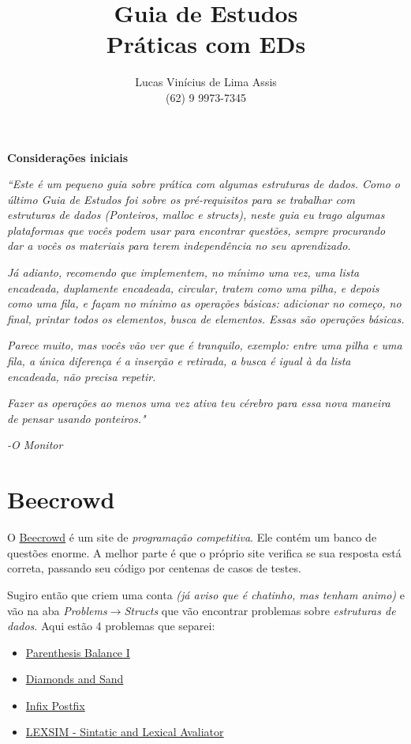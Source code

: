 \documentclass[a4paper]{article}
\author{Lucas Vinícius de Lima Assis\\ \small{(62) 9 9973-7345}}
\title{Guia de Estudos \\ Práticas com EDs}
\begin{document}
    \maketitle
    \begin{center}
        \textbf{Considerações iniciais}
    \end{center}

    \textit{``Este é um pequeno guia sobre prática com algumas estruturas de dados.
        Como o último Guia de Estudos foi sobre os \emph{pré-requisitos} para se
    trabalhar com estruturas de dados (Ponteiros, malloc e structs), neste guia
    eu trago algumas plataformas que vocês podem usar para encontrar questões,
    sempre procurando dar a vocês os materiais para terem independência no seu
    aprendizado.}   

    \textit{Já adianto, recomendo que implementem, no mínimo uma vez, uma lista
    encadeada, duplamente encadeada, circular, tratem como uma pilha, e depois
    como uma fila, e façam no mínimo as operações básicas:
    adicionar no começo, no final, printar todos os elementos, busca de
    elementos. Essas são operações básicas.} 

    \textit{Parece muito, mas vocês vão ver que é tranquilo, exemplo: entre uma
    pilha e uma fila, a única diferença é a inserção e retirada, a busca é igual
    à da lista encadeada, não precisa repetir.}

    \textit{Fazer as operações ao menos uma vez ativa teu cérebro para essa nova maneira
    de pensar usando ponteiros."}
    \begin{flushright}
        \textit{-O Monitor}
    \end{flushright}

    \section*{Beecrowd}
    O \href{https://www.beecrowd.com.br/}{Beecrowd} é um site de
    \emph{programação competitiva}. Ele contém um banco de questões enorme. A
    melhor parte é que o próprio site verifica se sua resposta está correta,
    passando seu código por centenas de casos de testes.
    
    Sugiro então que criem uma conta \textit{(já aviso que é chatinho, mas tenham
    animo)} e vão na aba \emph{Problems}$\to$\emph{Structs} que vão encontrar
    problemas sobre \emph{estruturas de dados}. Aqui estão 4 problemas que
    separei:

    \begin{itemize}
        \item \href{https://www.beecrowd.com.br/judge/en/problems/view/1068}{Parenthesis Balance I}
        \item \href{https://www.beecrowd.com.br/judge/en/problems/view/1069}{Diamonds
            and Sand}
        \item
            \href{https://www.beecrowd.com.br/judge/en/problems/view/1077}{Infix
            Postfix}
        \item
            \href{https://www.beecrowd.com.br/judge/en/problems/view/1083}{LEXSIM
            - Sintatic and Lexical Avaliator}
    \end{itemize}
\end{document}
